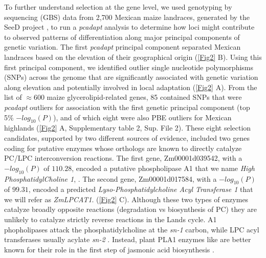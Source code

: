 To further understand selection at the gene level, we used genotyping by sequencing (GBS) data from 2,700 Mexican maize landraces, generated by the SeeD project \citep{romero_navarro2017-cn, gates2019-xu}, to run a \textit{pcadapt} \citep{luu2017-ws} analysis to determine how loci might contribute to observed patterns of differentiation along major principal components of genetic variation. 
The first \textit{pcadapt} principal component separated Mexican landraces based on the elevation of their geographical origin (\autoref{Fig2} B).
Using this first principal component, we identified outlier single nucleotide polymorphisms (SNPs) across the genome that are significantly associated with genetic variation along elevation and potentially involved in local adaptation (\autoref{Fig2} A).
From the list of $\approx 600$ maize glycerolipid-related genes, 85 contained SNPs that were \textit{pcadapt} outliers for association with the first genetic principal component (top 5\% $-log_{10}(P)$), and of which eight were also PBE outliers for Mexican highlands (\autoref{Fig2} A, Supplementary table 2, Sup. File 2). 
These eight selection candidates, supported by two different sources of evidence, included two genes coding for putative enzymes whose orthologs are known to directly catalyze PC/LPC interconversion reactions. 
The first gene, Zm00001d039542, with a $-log_{10}(P)$ of $110.28$, encoded a putative phospholipase A1 that we name \textit{High PhosphatidylCholine 1}, \hpc.
The second gene, Zm00001d017584, with a $-log_{10}(P)$ of $99.31$, encoded a predicted \textit{Lyso-Phosphatidylcholine Acyl Transferase 1} that we will refer as \textit{ZmLPCAT1}. (\autoref{Fig2} C). 
Although these two types of enzymes catalyze broadly opposite reactions (degradation vs biosynthesis of PC) they are unlikely to catalyze strictly reverse reactions in the Lands cycle. 
A1 phopholipases attack the phosphatidylcholine at the \textit{sn-1} carbon, while LPC acyl transferases usually acylate \textit{sn-2} \citep{wang2012,richmond2011}.
Instead, plant PLA1 enzymes like \hpc are better known for their role in the first step of jasmonic acid biosynthesis \citep{wang2018b, ishiguro2001-ob}.

